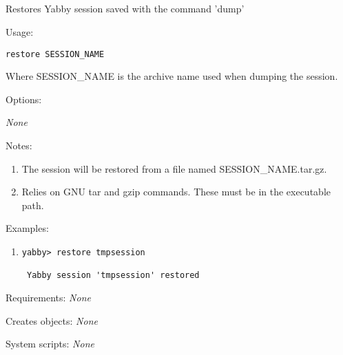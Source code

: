 

\subsection[restore]{  }



Restores Yabby session saved with the command 'dump'


\begin{description}


\item{Usage:}

{\tt restore SESSION\_NAME}

Where SESSION\_NAME is the archive name used when dumping
the session.


\item{Options:}
\begin{description}
{\em None}
\end{description}


\item{Notes:}
\begin{enumerate}
\item The session will be restored from a file named SESSION\_NAME.tar.gz.
\item Relies on GNU tar and gzip commands. These must be in the
 executable path.
\end{enumerate}


\item{Examples:}
\begin{enumerate}

\item
\begin{verbatim}
yabby> restore tmpsession

 Yabby session 'tmpsession' restored
\end{verbatim}

\end{enumerate}


\item{Requirements:} {\em None}


\item{Creates objects:} {\em None}


\item{System scripts:} {\em None}

\end{description}

